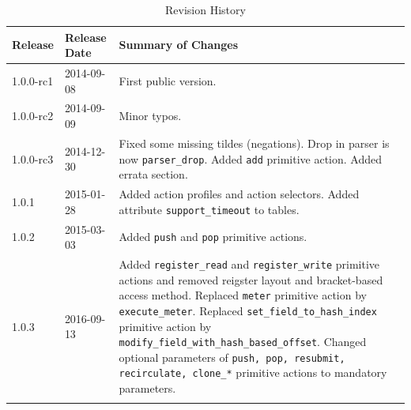 \documentclass[12pt]{article}
\begin{document}
\begin{table}[H]
\begin{center}
\begin{tabular}{| l | l | p{} |} \hline
\textbf{Release} &
\textbf{Release Date} &
\textbf{Summary of Changes} \\  \hline
1.0.0-rc1 & 2014-09-08 & First public version. \\  \hline
1.0.0-rc2 & 2014-09-09 & Minor typos. \\  \hline
1.0.0-rc3 & 2014-12-30 & Fixed some missing tildes (negations). Drop in parser is now \texttt{parser_drop}. Added \texttt{add} primitive action. Added errata section. \\  \hline
1.0.1 & 2015-01-28 & Added action profiles and action selectors. Added attribute \texttt{support_timeout} to tables. \\  \hline
1.0.2 & 2015-03-03 & Added \texttt{push} and \texttt{pop} primitive actions. \\  \hline
\color{red} 1.0.3 & \color{red} 2016-09-13 & \color{red} Added \texttt{register_read} and \texttt{register_write} primitive actions and removed reigster layout and bracket-based access method. Replaced \texttt{meter} primitive action by \texttt{execute_meter}. Replaced \texttt{set_field_to_hash_index} primitive action by \texttt{modify_field_with_hash_based_offset}. Changed optional parameters of \texttt{push, pop, resubmit, recirculate, clone_*} primitive actions to mandatory parameters.
\\ \hline
}
\end{tabular}
\end{center}
\caption{Revision History}
\label{tab:revhistory}
\end{table}


\end{document}
